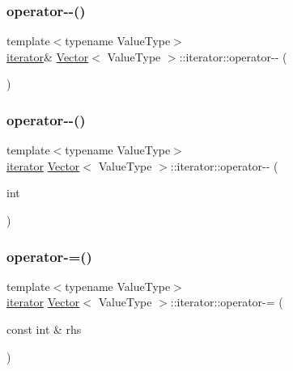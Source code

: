 \mbox{\label{classVector_1_1iterator_abd9e59936896a8f122e1447ca83e5783}} 
\subsubsection{\texorpdfstring{operator-\/-\/()}{operator--()}\hspace{0.1cm}{\footnotesize\ttfamily [1/2]}}
{\footnotesize\ttfamily template$<$typename Value\+Type$>$ \\
\mbox{\hyperlink{classVector_1_1iterator}{iterator}}\& \mbox{\hyperlink{classVector}{Vector}}$<$ Value\+Type $>$\+::iterator\+::operator-\/-\/ (\begin{DoxyParamCaption}{ }\end{DoxyParamCaption})\hspace{0.3cm}{\ttfamily [inline]}}

\mbox{\label{classVector_1_1iterator_a1ed0f955f13b3f41e07a868d3cb8f9fe}} 
\subsubsection{\texorpdfstring{operator-\/-\/()}{operator--()}\hspace{0.1cm}{\footnotesize\ttfamily [2/2]}}
{\footnotesize\ttfamily template$<$typename Value\+Type$>$ \\
\mbox{\hyperlink{classVector_1_1iterator}{iterator}} \mbox{\hyperlink{classVector}{Vector}}$<$ Value\+Type $>$\+::iterator\+::operator-\/-\/ (\begin{DoxyParamCaption}\item[{int}]{ }\end{DoxyParamCaption})\hspace{0.3cm}{\ttfamily [inline]}}

\mbox{\label{classVector_1_1iterator_a5ec3f04a58f155eea62bf49e0230148e}} 
\subsubsection{\texorpdfstring{operator-\/=()}{operator-=()}}
{\footnotesize\ttfamily template$<$typename Value\+Type$>$ \\
\mbox{\hyperlink{classVector_1_1iterator}{iterator}} \mbox{\hyperlink{classVector}{Vector}}$<$ Value\+Type $>$\+::iterator\+::operator-\/= (\begin{DoxyParamCaption}\item[{const int \&}]{rhs }\end{DoxyParamCaption})\hspace{0.3cm}{\ttfamily [inline]}}

